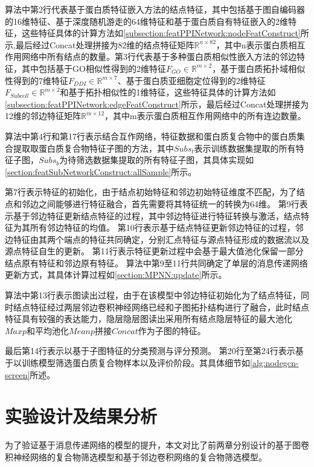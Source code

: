 算法中第2行代表基于蛋白质特征嵌入方法的结点特征，其中包括基于图自编码器的16维特征、基于深度随机游走的64维特征和基于蛋白质自有特征嵌入的2维特征，这些特征具体的计算方法如\ref{subsection:featPPINetwork:nodeFeatConstruct}所示,最后经过Concat处理拼接为82维的结点特征矩阵$\mathbb{R}^{n\times 82}$，其中n表示蛋白质相互作用网络中所有结点的数量。第3行代表基于多种蛋白质相似性嵌入方法的邻边特征，其中包括基于GO相似性得到的2维特征$F_{GO}\in \mathbb{R}^{m\times 2}$，基于蛋白质拓扑域相似性得到的7维特征$F_{DDI}\in \mathbb{R}^{m\times 7}$、基于蛋白质亚细胞定位得到的2维特征$F_{Subcell}\in \mathbb{R}^{m\times 2}$和基于拓扑相似性的1维特征，这些特征具体的计算方法如\ref{subsection:featPPINetwork:edgeFeatConstruct}所示，最后经过Concat处理拼接为12维的邻边特征矩阵$\mathbb{R}^{m\times 12}$，其中m表示蛋白质相互作用网络中的所有连边数量。

算法中第4行和第17行表示结合互作网络，特征数据和蛋白质复合物中的蛋白质集合提取取蛋白质复合物特征子图的方法，其中$Subs_t$表示训练数据集提取的所有特征子图，$Subs_b$为待筛选数据集提取的所有特征子图，其具体实现如\ref{section:featSubNetworkConstruct:allSample}所示。

第7行表示特征的初始化，由于结点初始特征和邻边初始特征维度不匹配，为了结点和邻边之间能够进行特征融合，首先需要将其特征统一的转换为64维。
第9行表示基于邻边特征更新结点特征的过程，其中邻边特征进行特征转换与激活，结点特征为其所有邻边特征的均值。
第10行表示基于结点特征更新邻边特征的过程，邻边特征由其两个端点的特征共同确定，分别汇点特征与源点特征形成的数据流以及源点特征自生的更新。
第11行表示特征更新过程中会基于最大值池化保留一部分结点原有特征和邻边原有特征。
算法中第9至11行共同确定了单层的消息传递网络更新方式，其具体计算过程如\ref{section:MPNN:update}所示。

算法中第13行表示图读出过程，由于在该模型中邻边特征初始化为了结点特征，同时结点特征经过两层邻边卷积神经网络已经和子图拓扑结构进行了融合，此时结点特征具有较强的表达能力，隐层隐层图读出采用所有结点隐层特征的最大池化$Maxp$和平均池化$Meanp$拼接$Concat$作为子图的特征。

最后第14行表示以基于子图特征的分类预测与评分预测。
第20行至第24行表示基于以训练模型筛选蛋白质复合物样本以及评价阶段。其具体细节如\ref{alg:nodegcn-screen}所述。

\section{实验设计及结果分析}
\label{section:MPNN:experience}
为了验证基于消息传递网络的模型的提升，本文对比了前两章分别设计的基于图卷积神经网络的复合物筛选模型和基于邻边卷积网络的复合物筛选模型。

